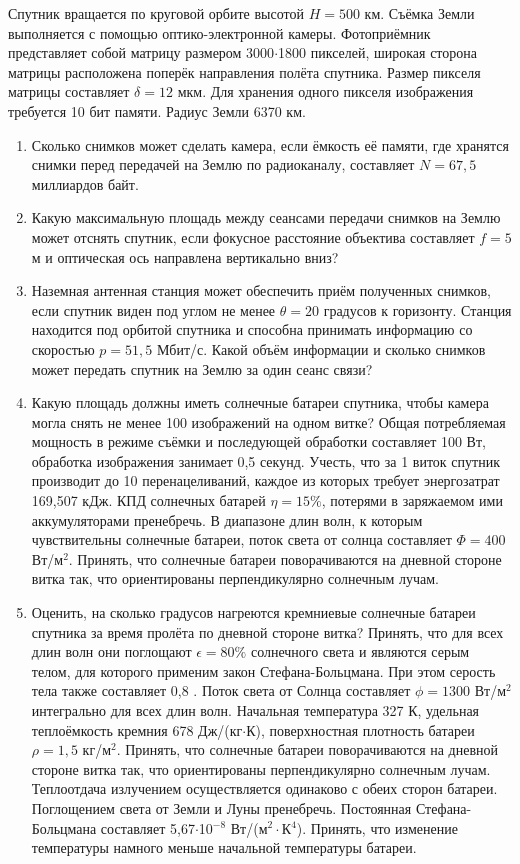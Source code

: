 
Спутник вращается по круговой орбите высотой $H=500$ км. Съёмка Земли выполняется с помощью оптико-электронной 
камеры. Фотоприёмник представляет собой матрицу размером 3000$\cdot$1800 пикселей, широкая сторона матрицы 
расположена поперёк направления полёта спутника. Размер пикселя матрицы составляет $\delta=12$ мкм. Для хранения 
одного пикселя изображения требуется 10 бит памяти. Радиус Земли 6370 км.

\begin{enumerate}
    \item Сколько снимков может сделать камера, если ёмкость её памяти, где хранятся снимки перед передачей на 
    Землю по радиоканалу,  составляет $N=67,5$ миллиардов байт.
    \item Какую максимальную площадь между сеансами передачи снимков на Землю может отснять спутник, если 
    фокусное расстояние объектива составляет $f=5$ м и оптическая ось направлена вертикально вниз?
    \item Наземная антенная станция может обеспечить приём полученных снимков, если спутник виден под углом не 
    менее $\theta=20$ градусов к горизонту. Станция находится под орбитой спутника и способна принимать информацию 
    со скоростью $p=51,5$ Мбит/с. Какой объём информации и сколько снимков может передать спутник на Землю за 
    один сеанс связи? 
    \item Какую площадь должны иметь солнечные батареи спутника, чтобы камера могла снять не менее 100 
    изображений на одном витке? Общая потребляемая мощность в режиме съёмки и последующей обработки составляет 
    100 Вт, обработка изображения занимает 0,5 секунд. Учесть, что за 1 виток спутник производит до 10 
    перенацеливаний, каждое из которых требует энергозатрат 169,507 кДж. КПД солнечных батарей $\eta=15\%$, 
    потерями в заряжаемом ими аккумуляторами пренебречь. В диапазоне длин волн, к которым чувствительны солнечные 
    батареи, поток света от солнца составляет $\Phi=400$ Вт/м$^2$. Принять, что солнечные батареи поворачиваются на 
    дневной стороне витка так, что ориентированы перпендикулярно солнечным лучам.
    \item Оценить, на сколько градусов нагреются кремниевые солнечные батареи спутника за время пролёта по 
    дневной стороне витка? Принять, что для всех длин волн они поглощают $\epsilon=80\%$ солнечного света и 
    являются серым телом, для которого применим закон Стефана-Больцмана. При этом серость тела также составляет 
    0,8 . Поток света от Солнца составляет $\phi=1300$ Вт/м$^2$  интегрально для всех длин волн. Начальная 
    температура 327 К, удельная теплоёмкость кремния 678 Дж/(кг$\cdot$К), поверхностная плотность батареи $\rho=1,5$ кг/м$^2$. 
    Принять, что солнечные батареи поворачиваются на дневной стороне витка так, что ориентированы перпендикулярно 
    солнечным лучам. Теплоотдача излучением осуществляется одинаково с обеих сторон батареи. Поглощением света 
    от Земли и Луны пренебречь. Постоянная Стефана-Больцмана составляет 5,67$\cdot$10$^{-8}$ Вт/(м$^2\cdot$К$^4$). 
    Принять, что изменение температуры намного меньше начальной температуры батареи.
\end{enumerate}